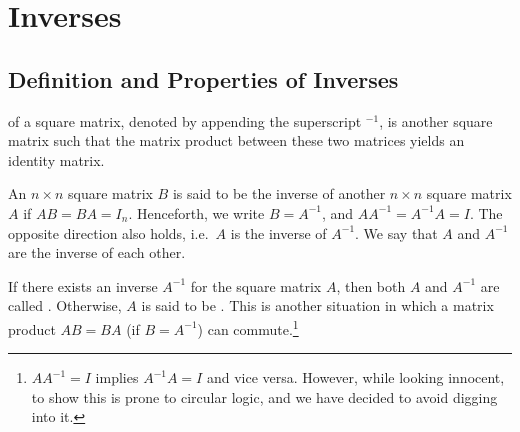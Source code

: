 \section{Inverses}
\label{section:inv}
\subsection{Definition and Properties of Inverses}
 of a square matrix, denoted by appending the superscript $^{-1}$, is another square matrix such that the matrix product between these two matrices yields an identity matrix.
\begin{defn}[Inverse]
\label{defn:inverse}
An $n \times n$ square matrix $B$ is said to be the inverse of another $n \times n$ square matrix $A$ if $AB = BA = I_n$. Henceforth, we write $B = A^{-1}$, and $AA^{-1} = A^{-1}A = I$. The opposite direction also holds, i.e.\ $A$ is the inverse of $A^{-1}$. We say that $A$ and $A^{-1}$ are the inverse of each other.
\end{defn}
If there exists an inverse $A^{-1}$ for the square matrix $A$, then both $A$ and $A^{-1}$ are called . Otherwise, $A$ is said to be . This is another situation in which a matrix product $AB = BA$ (if $B=A^{-1}$) can commute.\footnote{$AA^{-1} = I$ implies $A^{-1}A = I$ and vice versa. However, while looking innocent, to show this is prone to circular logic, and we have decided to avoid digging into it.} %
